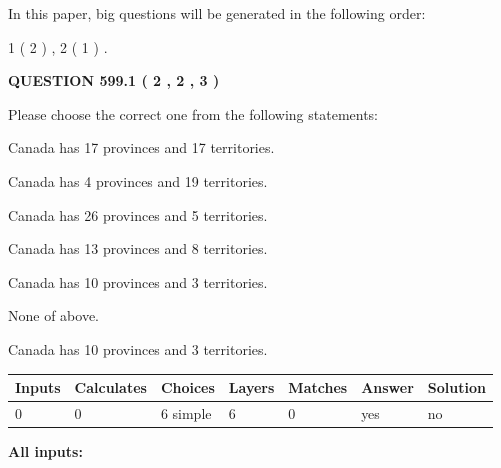 \documentclass[12pt]{article}
\begin{document}
In this paper, big questions will be generated in the following order: 
   
   
   1 ( 2 )
 ,
   2 ( 1 )
 .
  
\vspace{0.2in}
  
{\textbf{\Large{QUESTION
599.1 
 ( 2 , 2 , 3 )
}}}
  
  
Please choose the correct one from the following statements:
 
 
Canada has  17 provinces and  17 territories.
 
 
Canada has   4 provinces and  19 territories.
 
 
Canada has  26 provinces and  5 territories.
 
 
Canada has  13 provinces and  8 territories.
 
 
Canada has 10  provinces and 3 territories.
 
 
 None of above.
 
 
\noindent{}
 
 
Canada has 10  provinces and 3 territories.
 
 
\noindent{}
 
 
   
   
   
   
\noindent\begin{tabular}{|l|l|l|l|l|l|l|}
 \hline
Inputs & Calculates & Choices & Layers & Matches & Answer & Solution \\ \hline
 0  & 
 0  & 
 6
  simple  
  & 
 6  & 
 0  & 
  yes & 
  no 
  \\ \hline
 \end{tabular}
   
   
   
   
\noindent{}
   
   
   
   
\noindent\vspace{0.1in}\hspace{-0.08in} {\textbf{\Large{All inputs: }}}
   
\end{document}
